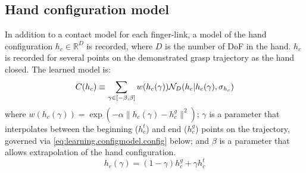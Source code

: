 \subsection{Hand configuration model}
In addition to a contact model for each finger-link, a model of the hand configuration $h_c \in \mathbb R^D$ is recorded, where $D$ is the number of DoF in the hand. $h_c$  is recorded for several points on the demonstrated grasp trajectory as the hand closed. The learned model is:
\begin{equation}
\hc(h_c) \equiv \sum_{\gamma \in [-\beta, \beta]} w({h_c(\gamma)}) \mathcal{N}_D(h_c|h_c(\gamma), \sigma_{h_c}) 
\label{eq:hc}
\end{equation}
where $w({h_c(\gamma)}) = \exp(-\alpha \|h_c(\gamma) - h^g_c \|^2)$; $\gamma$ is a parameter that interpolates between the beginning ($h^t_c$) and end ($h^g_c$) points on the trajectory, governed via \eq\ref{eq:learning.configmodel.config} below; and $\beta$ is a parameter that allows extrapolation of the hand configuration.
\begin{equation}
h_c(\gamma) = (1 - \gamma)h^g_c + \gamma h^t_c
\label{eq:learning.configmodel.config}
\end{equation}
